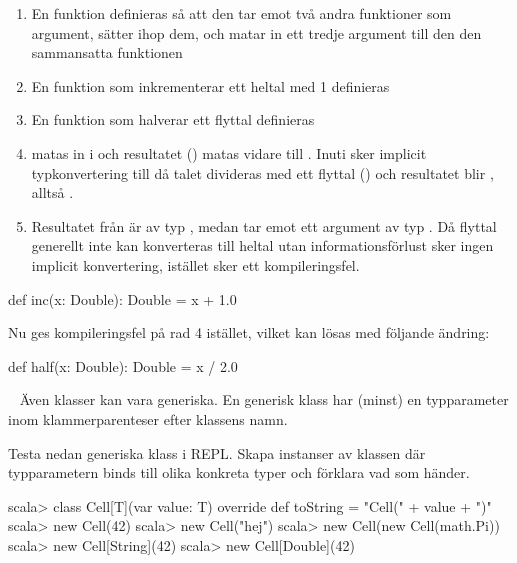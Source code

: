 \SubtaskSolved   \begin{enumerate}
\item En funktion definieras så att den tar emot två andra funktioner som argument, sätter ihop dem, och matar in ett tredje argument till den den sammansatta funktionen
\item En funktion som inkrementerar ett heltal med 1 definieras
\item En funktion som halverar ett flyttal definieras
\item {} matas in i  och resultatet () matas vidare till . Inuti  sker implicit typkonvertering till  då talet divideras med ett flyttal () och resultatet blir , alltså .
\item Resultatet från  är av typ , medan  tar emot ett argument av typ . Då flyttal generellt inte kan konverteras till heltal utan informationsförlust sker ingen implicit konvertering, istället sker ett kompileringsfel.
\end{enumerate}

\SubtaskSolved  \begin{Code}
def inc(x: Double): Double = x + 1.0
\end{Code}
Nu ges kompileringsfel på rad 4 istället, vilket kan lösas med följande ändring:
\begin{Code}
def half(x: Double): Double = x / 2.0
\end{Code}




\QUESTEND









\QUESTBEGIN

\Task  \what~  Även klasser kan vara generiska. En generisk klass har (minst) en typparameter inom klammerparenteser efter klassens namn.

\Subtask Testa nedan generiska klass  i REPL. Skapa instanser av klassen  där typparametern  binds till olika konkreta typer och förklara vad som händer.

\begin{REPL}
scala> class Cell[T](var value: T){
         override def toString = "Cell(" + value + ")"
       }
scala> new Cell(42)
scala> new Cell("hej")
scala> new Cell(new Cell(math.Pi))
scala> new Cell[String](42)
scala> new Cell[Double](42)
\end{REPL}

